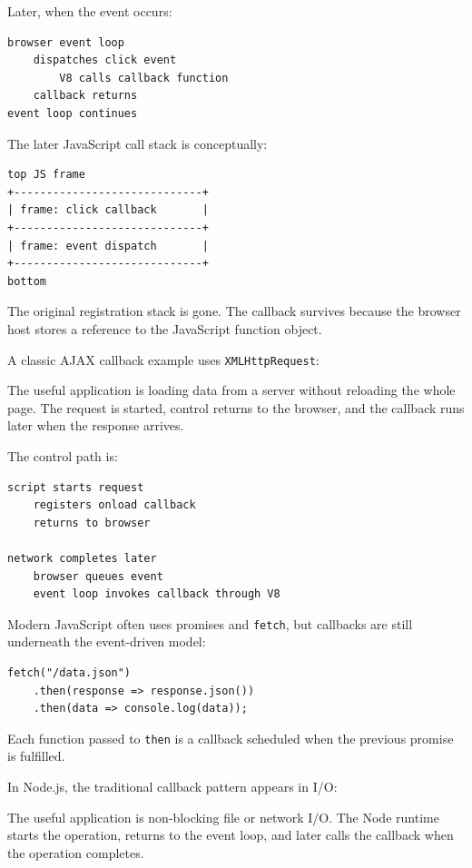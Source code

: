 Later, when the event occurs:

\begin{verbatim}
browser event loop
    dispatches click event
        V8 calls callback function
    callback returns
event loop continues
\end{verbatim}

The later JavaScript call stack is conceptually:

\begin{verbatim}
top JS frame
+-----------------------------+
| frame: click callback       |
+-----------------------------+
| frame: event dispatch       |
+-----------------------------+
bottom
\end{verbatim}

The original registration stack is gone. The callback survives because the browser host stores a reference to the JavaScript function object.

A classic AJAX callback example uses \texttt{XMLHttpRequest}:

The useful application is loading data from a server without reloading the whole page. The request is started, control returns to the browser, and the callback runs later when the response arrives.

The control path is:

\begin{verbatim}
script starts request
    registers onload callback
    returns to browser

network completes later
    browser queues event
    event loop invokes callback through V8
\end{verbatim}

Modern JavaScript often uses promises and \texttt{fetch}, but callbacks are still underneath the event-driven model:

\begin{verbatim}
fetch("/data.json")
    .then(response => response.json())
    .then(data => console.log(data));
\end{verbatim}

Each function passed to \texttt{then} is a callback scheduled when the previous promise is fulfilled.

In Node.js, the traditional callback pattern appears in I/O:

The useful application is non-blocking file or network I/O. The Node runtime starts the operation, returns to the event loop, and later calls the callback when the operation completes.

